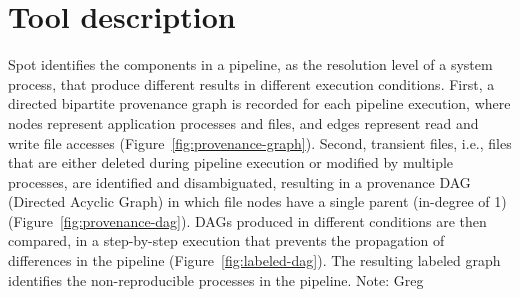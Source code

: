 \documentclass[a4paper,num-refs]{oup-contemporary}
\newcommand{\note}[2]{\color{blue}Note: #1\color{black}}
\newcommand{\toolname}[0]{Spot\xspace}
\begin{document}

\newpage

\section{Tool description}

\toolname identifies the components in a pipeline, as the resolution level of a system process, that produce different
results in different execution conditions. First, a directed
bipartite provenance graph is recorded for each pipeline execution, where nodes
represent application processes and files, and edges represent read and
write file accesses (Figure~\ref{fig:provenance-graph}). Second,
transient files, i.e., files that are either deleted during pipeline
execution or modified by multiple processes, are identified and
disambiguated, resulting in a provenance DAG (Directed Acyclic
Graph) in which file nodes have a single parent (in-degree of 1) (Figure~\ref{fig:provenance-dag}). 
DAGs produced in different conditions are then compared, in
a step-by-step execution that prevents the propagation of differences in the pipeline (Figure~\ref{fig:labeled-dag}).
 The resulting labeled graph identifies the
non-reproducible processes in the pipeline. \note{Greg}{clarify why many processes don't appear in the graph as shown}
\end{document}
